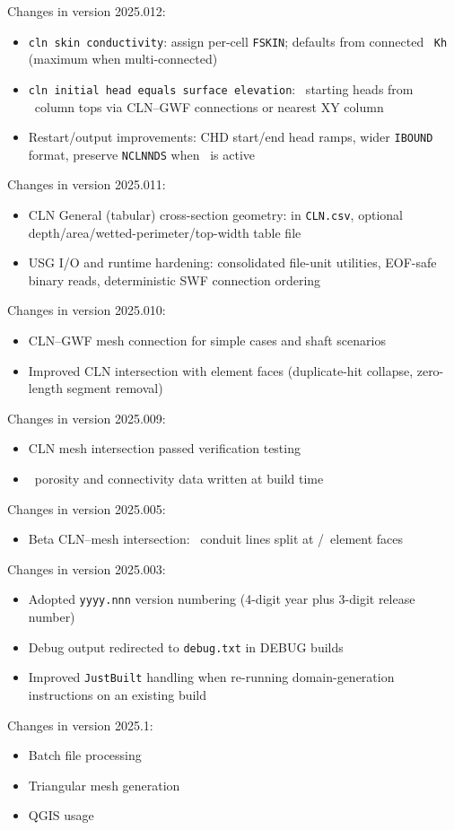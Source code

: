 \label{changes:2025.012}
Changes in version 2025.012:
\begin{itemize}
\item \texttt{cln skin conductivity}: assign per-cell \texttt{FSKIN}; defaults from connected \gwf\ \texttt{Kh} (maximum when multi-connected)
\item \texttt{cln initial head equals surface elevation}: \cln\ starting heads from \gwf\ column tops via CLN--GWF connections or nearest XY column
\item Restart/output improvements: CHD start/end head ramps, wider \texttt{IBOUND} format, preserve \texttt{NCLNNDS} when \cln\ is active
\end{itemize}

\label{changes:2025.011}
Changes in version 2025.011:
\begin{itemize}
\item CLN General (tabular) cross-section geometry:  in \texttt{CLN.csv}, optional depth/area/wetted-perimeter/top-width table file
\item USG I/O and runtime hardening: consolidated file-unit utilities, EOF-safe binary reads, deterministic SWF connection ordering
\end{itemize}

\label{changes:2025.010}
Changes in version 2025.010:
\begin{itemize}
\item CLN--GWF mesh connection for simple cases and shaft scenarios
\item Improved CLN intersection with element faces (duplicate-hit collapse, zero-length segment removal)
\end{itemize}

\label{changes:2025.009}
Changes in version 2025.009:
\begin{itemize}
\item CLN mesh intersection passed verification testing
\item \gwf\ porosity and connectivity data written at build time
\end{itemize}

\label{changes:2025.005}
Changes in version 2025.005:
\begin{itemize}
\item Beta CLN--mesh intersection: \cln\ conduit lines split at \gwf/\swf\ element faces
\end{itemize}

\label{changes:2025.003}
Changes in version 2025.003:
\begin{itemize}
\item Adopted \texttt{yyyy.nnn} version numbering (4-digit year plus 3-digit release number)
\item Debug output redirected to \texttt{debug.txt} in DEBUG builds
\item Improved \texttt{JustBuilt} handling when re-running domain-generation instructions on an existing build
\end{itemize}

\label{changes:2025.1}
Changes in version 2025.1:
\begin{itemize}
\item Batch file processing
\item Triangular mesh generation
\item QGIS usage
\end{itemize}
